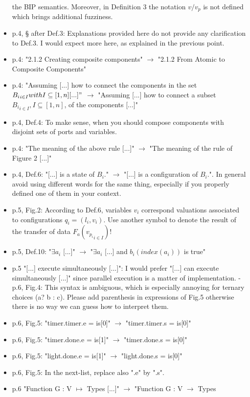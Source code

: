 \begin{itemize}
the BIP semantics. Moreover, in Definition 3 the notation $v/v_p$ is not 
defined which brings additional fuzziness.
\item p.4, § after Def.3: Explanations provided here do not provide any 
clarification to Def.3. I would expect more here, as explained in the 
previous point.
\item p.4: "2.1.2 Creating composite components" $\rightarrow$ "2.1.2 From Atomic to 
Composite Components"
\item p.4: "Assuming [...] how to connect the components in the set ${B_i}_{i \in 
I} with I \subseteq [1,n] [...]"$ $\rightarrow$ "Assuming [...] how to connect a subset 
${B_i}_{i \in I}, I \subseteq [1,n]$, of the components [...]"
\item p.4, Def.4: To make sense, when you should compose components with disjoint 
sets of ports and variables.
\item p.4: "The meaning of the above rule [...]" $\rightarrow$ "The meaning of the rule of 
Figure 2 [...]"
\item p.4, Def.6: "[...] is a state of $B_i$." $\rightarrow$ "[...] is a configuration of 
$B_i$.". In general avoid using different words for the same thing, especially 
if you properly defined one of them in your context.
\item p.5, Fig.2: According to Def.6, variables $v_i$ correspond valuations 
associated to configurations $q_i = (l_i, v_i)$. Use another symbol to denote 
the result of the transfer of data $F_a({ v_{p_i} }_{i \in I})$!
\item p.5, Def.10: "$\exists a_i$ [...]" $\rightarrow$ "$\exists a_i$ [...] and $b_i(index(a_i))$ is 
true"
\item p.5 "[...] execute simultaneously [...]": I would prefer "[...] can execute 
simultaneously [...]" since parallel execution is a matter of implementation.
- p.6, Fig.4: This syntax is ambiguous, which is especially annoying for 
ternary choices (a? b : c). Please add parenthesis in expressions of Fig.5 
otherwise there is no way we can guess how to interpret them.
\item p.6, Fig.5: "timer.timer.e = is[0]" $\rightarrow$ "timer.timer.s = is[0]"
\item p.6, Fig.5: "timer.done.e = is[1]" $\rightarrow$ "timer.done.s = is[0]"
\item p.6, Fig.5: "light.done.e = is[1]" $\rightarrow$ "light.done.s = is[0]"
\item p.6, Fig.5: In the next-list, replace also ".e" by ".s".
\item p.6 "Function G : V $\mapsto$ Types [...]" $\rightarrow$ "Function G : V $\to$ Types 

\end{itemize}
